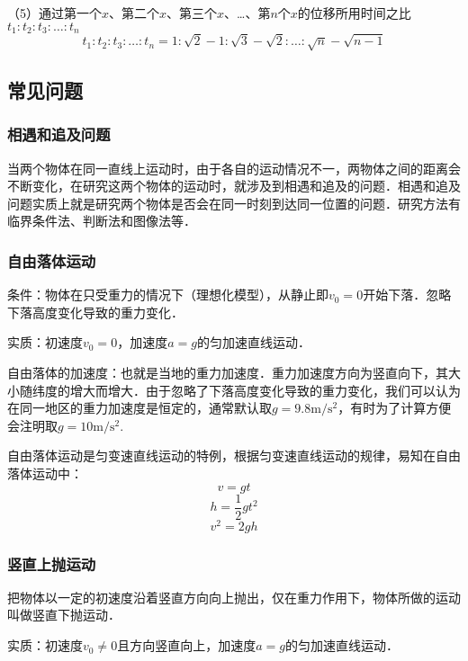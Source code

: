 （5）通过第一个$x$、第二个$x$、第三个$x$、…、第$n$个$x$的位移所用时间之比$t_1:t_2:t_3:\dots:t_n$
\begin{equation}
t_1:t_2:t_3:\dots:t_n=1:\sqrt{2}-1:\sqrt{3}-\sqrt{2}:\dots:\sqrt{n}-\sqrt{n-1}
\end{equation}

\subsection{常见问题}
\subsubsection{相遇和追及问题}
当两个物体在同一直线上运动时，由于各自的运动情况不一，两物体之间的距离会不断变化，在研究这两个物体的运动时，就涉及到相遇和追及的问题．相遇和追及问题实质上就是研究两个物体是否会在同一时刻到达同一位置的问题．研究方法有临界条件法、判断法和图像法等．

\subsubsection{自由落体运动}
条件：物体在只受重力的情况下（理想化模型），从静止即$v_0=0$开始下落．忽略下落高度变化导致的重力变化．

实质：初速度$v_0=0$，加速度$a=g$的匀加速直线运动．

自由落体的加速度：也就是当地的重力加速度．重力加速度方向为竖直向下，其大小随纬度的增大而增大．由于忽略了下落高度变化导致的重力变化，我们可以认为在同一地区的重力加速度是恒定的，通常默认取$g=9.8\mathrm{m/s^2}$，有时为了计算方便会注明取$g=10\mathrm{m/s^2}$.

自由落体运动是匀变速直线运动的特例，根据匀变速直线运动的规律，易知在自由落体运动中：
\begin{equation}
v=gt
\end{equation}
\begin{equation}
h=\frac12gt^2
\end{equation}
\begin{equation}
v^2=2gh
\end{equation}

\subsubsection{竖直上抛运动}
把物体以一定的初速度沿着竖直方向向上抛出，仅在重力作用下，物体所做的运动叫做竖直下抛运动．

实质：初速度$v_0\neq0$且方向竖直向上，加速度$a=g$的匀加速直线运动．

